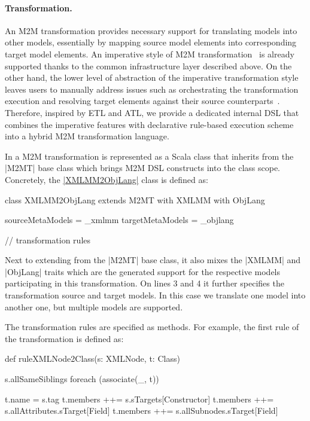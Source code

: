 \paragraph{Transformation.}
%
An M2M transformation provides necessary support for translating models into other models, essentially by mapping source model elements into corresponding target model elements.
An imperative style of M2M transformation~\cite{Czarnecki2006} is already supported thanks to the common infrastructure layer described above.
On the other hand, the lower level of abstraction of the imperative transformation style leaves users to manually address issues such as orchestrating the transformation execution and resolving target elements against their source counterparts~\cite{Kolovos2008a}.
Therefore, inspired by ETL and ATL, we provide a dedicated internal DSL that combines the imperative features with declarative rule-based execution scheme into a hybrid M2M transformation language.

In \SIGMA a M2M transformation is represented as a Scala class that inherits from the \Scala|M2MT| base class which brings M2M DSL constructs into the class scope.
Concretely, the \href{https://github.com/fikovnik/ttc14-fixml-sigma/blob/master/ttc14-fixml-base/src/fr/inria/spirals/sigma/ttc14/fixml/XMLMM2ObjLang.scala}{\Scala|XMLMM2ObjLang|} class is defined as:
%
\begin{scalacode}
class XMLMM2ObjLang extends M2MT with XMLMM with ObjLang {

  sourceMetaModels = _xmlmm
  targetMetaModels = _objlang

  // transformation rules
}  
\end{scalacode}
%
Next to extending from the \Scala|M2MT| base class, it also mixes the \Scala|XMLMM| and \Scala|ObjLang| traits which are the generated support for the respective models participating in this transformation.
On lines 3 and 4 it further specifies the transformation source and target models.
In this case we translate one model into another one, but multiple models are supported.

The transformation rules are specified as methods.
For example, the first rule of the transformation is defined as:
%
\begin{scalacode}
def ruleXMLNode2Class(s: XMLNode, t: Class) {
  s.allSameSiblings foreach (associate(_, t))

  t.name = s.tag
  t.members ++= s.sTargets[Constructor]
  t.members ++= s.allAttributes.sTarget[Field]
  t.members ++= s.allSubnodes.sTarget[Field]
}
\end{scalacode}

